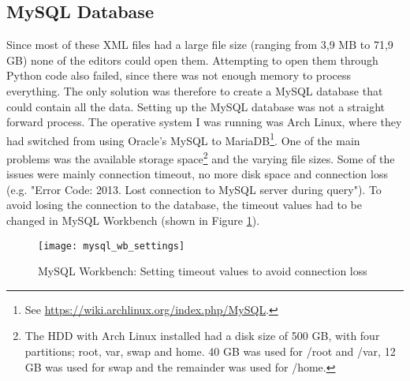 \subsection{MySQL Database}
Since most of these XML files had a large file size (ranging from 3,9 MB to 71,9 GB) none of the editors could open them. 
Attempting to open them through Python code also failed, since there was not enough memory to process everything. 
The only solution was therefore to create a MySQL database that could contain all the data. 
\vspace{0.5em}\newline
Setting up the MySQL database was not a straight forward process. 
The operative system I was running was Arch Linux, where they had switched from using Oracle's MySQL to 
MariaDB\footnote{
	See \url{https://wiki.archlinux.org/index.php/MySQL}.
	}. 
One of the main problems was the available storage space\footnote{
	The HDD with Arch Linux installed had a disk size of 500 GB, with four partitions; root, var, swap and home. 
	40 GB was used for /root and /var, 12 GB was used for swap and the remainder was used for /home.
	} 
and the varying file sizes. 
Some of the issues were mainly connection timeout, no more disk space and connection loss (e.g. "Error Code: 2013. Lost connection to MySQL server during query"). 
To avoid losing the connection to the database, the timeout values had to be changed in MySQL Workbench (shown in Figure \ref{fig:mysql_wb_settings}).
\begin{figure}[ht]
	\centering
	\texttt{[image: mysql\_wb\_settings]}
	\caption{MySQL Workbench: Setting timeout values to avoid connection loss}
	\label{fig:mysql_wb_settings}
\end{figure}

